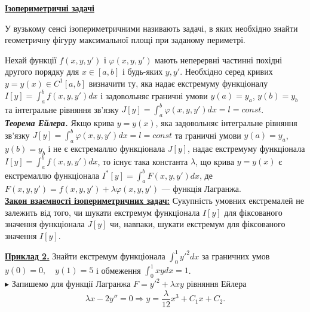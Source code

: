 \documentclass[12pt,a4paper]{article}
\begin{document}
	\begin{center}
		\underline{\textbf{Ізопериметричні задачі}}
	\end{center}
	
	У вузькому сенсі ізопериметричними називають задачі, в яких необхідно знайти геометричну фігуру
	максимальної площі при заданому периметрі.
	
	Нехай функції $f(x, y, y')$ і $\varphi(x, y, y')$
	мають неперервні частинні похідні другого порядку для $x \in [a,b]$ і будь-яких $y, y'$.
	Необхідно серед кривих $y = y(x) \in C^{1}[a, b]$ визначити ту, яка надає екстремуму функціоналу
	$I[y] = \int_{a}^{b} f(x, y, y')dx$
	і задовольняє граничні умови $y(a) = y_a$, $y(b) = y_b$
	та інтегральне рівняння зв’язку $J[y] = \int_{a}^{b} \varphi(x, y, y')dx = l = const$.\\
	\textit{\textbf{Теорема Ейлера.}}
		Якщо крива $y = y(x)$, яка задовольняє інтегральне рівняння зв’язку
		$J[y] = \int_{a}^{b} \varphi(x, y, y')dx = l = const$
		та граничні умови  $y(a) = y_a$, $y(b) = y_b$ і не є екстремаллю функціонала $J[y]$,
		надає екстремуму функціонала $I[y] = \int_{a}^{b} f(x, y, y')dx$,
		то існує така константа $\lambda$, що крива $y = y(x)$
		є екстремаллю функціонала $I^*[y] = \int_{a}^{b} F(x, y, y')dx$,
		де $F(x, y, y') = f(x, y, y') + \lambda \varphi(x, y , y')$ --- функція Лагранжа.\\
	\underline{\textbf{Закон взаємності ізопериметричних задач:}} Сукупність умовних екстремалей не залежить від того, чи шукати екстремум функціонала $I[y]$ для фіксованого значення функціонала $J[y]$ чи, навпаки, шукати екстремум для фіксованого значення $I[y]$.

	\underline{\textbf{Приклад 2.}} Знайти екстремум функціонала $\int_{0}^{1} {y'}^{2}dx$ за граничних умов
	$y(0) = 0,\quad y(1) = 5$ і обмеження $\int_{0}^{1} xydx = 1$.\\
	$\blacktriangleright$ Запишемо для функції Лагранжа $F = {y'}^{2} + \lambda x y $ рівняння Ейлера
	$$\lambda x - 2y'' = 0 \Rightarrow y = \frac{\lambda}{12} x^3 + C_1x + C_2.$$
\end{document}

